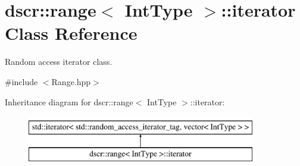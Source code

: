 \hypertarget{classdscr_1_1range_1_1iterator}{\section{dscr\-:\-:range$<$ Int\-Type $>$\-:\-:iterator Class Reference}
\label{classdscr_1_1range_1_1iterator}
}


Random access iterator class.  




{\ttfamily \#include $<$Range.\-hpp$>$}

Inheritance diagram for dscr\-:\-:range$<$ Int\-Type $>$\-:\-:iterator\-:\begin{figure}[H]
\begin{center}
\leavevmode
\includegraphics[height=2.000000cm]{classdscr_1_1range_1_1iterator}
\end{center}
\end{figure}
